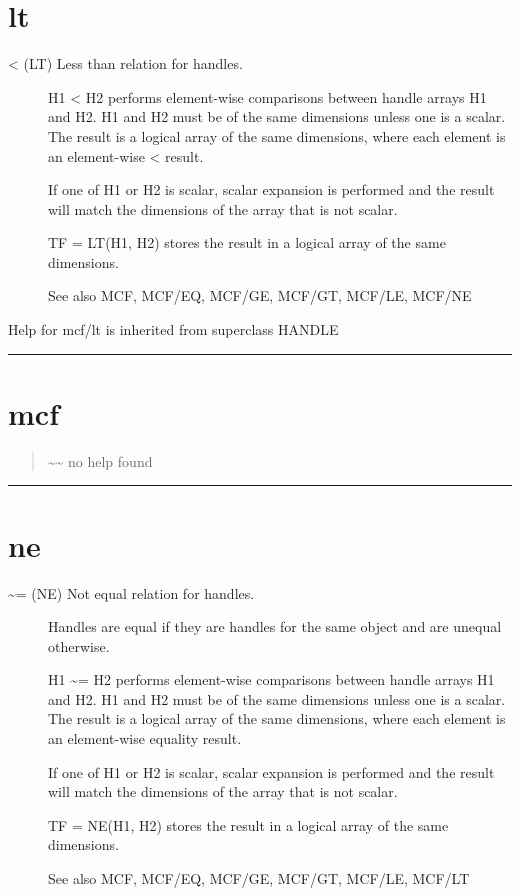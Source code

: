 \documentclass[letterpaper,10pt,english]{sphinxmanual}
\begin{document}
\section{lt}
\label{classes/utils/@mcf/mcf:id21}\label{classes/utils/@mcf/mcf:lt}\begin{description}
\item[{\textless{} (LT)   Less than relation for handles.}] \leavevmode
H1 \textless{} H2 performs element-wise comparisons between handle arrays H1 and
H2.  H1 and H2 must be of the same dimensions unless one is a scalar.
The result is a logical array of the same dimensions, where each
element is an element-wise \textless{} result.

If one of H1 or H2 is scalar, scalar expansion is performed and the
result will match the dimensions of the array that is not scalar.

TF = LT(H1, H2) stores the result in a logical array of the same
dimensions.

See also MCF, MCF/EQ, MCF/GE, MCF/GT, MCF/LE, MCF/NE

\end{description}

Help for mcf/lt is inherited from superclass HANDLE


\bigskip\hrule{}\bigskip



\section{mcf}
\label{classes/utils/@mcf/mcf:mcf}\label{classes/utils/@mcf/mcf:id22}\begin{quote}

\textasciitilde{}\textasciitilde{} no help found
\end{quote}


\bigskip\hrule{}\bigskip



\section{ne}
\label{classes/utils/@mcf/mcf:id23}\label{classes/utils/@mcf/mcf:ne}\begin{description}
\item[{\textasciitilde{}= (NE)   Not equal relation for handles.}] \leavevmode
Handles are equal if they are handles for the same object and are
unequal otherwise.

H1 \textasciitilde{}= H2 performs element-wise comparisons between handle arrays H1
and H2.  H1 and H2 must be of the same dimensions unless one is a
scalar.  The result is a logical array of the same dimensions, where
each element is an element-wise equality result.

If one of H1 or H2 is scalar, scalar expansion is performed and the
result will match the dimensions of the array that is not scalar.

TF = NE(H1, H2) stores the result in a logical array of the same
dimensions.

See also MCF, MCF/EQ, MCF/GE, MCF/GT, MCF/LE, MCF/LT

\end{description}
\end{document}
